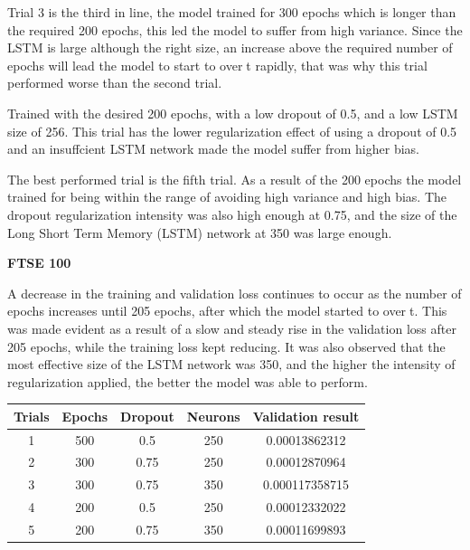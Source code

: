 \documentclass[a4paper,11pt,oneside]{book}
\begin{document}
Trial 3 is the third in line, the model trained for 300 epochs which is longer than the required 200 epochs,
this led the model to suffer from high variance. Since the LSTM is large although the right size, an increase
above the required number of epochs will lead the model to start to overt rapidly, that was why this trial
performed worse than the second trial.\newline

Trained with the desired 200 epochs, with a low dropout of 0.5, and a low LSTM size of 256. This trial
has the lower regularization effect of using a dropout of 0.5 and an insuffcient LSTM
network made the model suffer from higher bias.\newline

The best performed trial is the fifth trial. As a result of the 200 epochs the model trained for being within the range
of avoiding high variance and high bias. The dropout regularization intensity was also high enough at 0.75,
and the size of the Long Short Term Memory (LSTM) network at 350 was large enough.\newline\newline

\textbf{FTSE 100}\newline\newline

A decrease in the training and validation loss continues to occur as the number of epochs increases until 205
epochs, after which the model started to overt. This was made evident as a result of a slow and steady rise
in the validation loss after 205 epochs, while the training loss kept reducing.
It was also observed that the most effective size of the LSTM network was 350, and the higher the intensity
of regularization applied, the better the model was able to perform.
\begin{center}
	\begin{tabular}{||c c c c c||} 
		\hline
		Trials & Epochs & Dropout & Neurons & Validation result\\ [0.5ex] 
		\hline\hline
		1 & 500 & 0.5 & 250 & 0.00013862312 \\ 
		\hline
		2 & 300 & 0.75 & 250 & 0.00012870964 \\
		\hline
		3 & 300 & 0.75 & 350 & 0.000117358715 \\
		\hline
		4 & 200 & 0.5 & 250 & 0.00012332022 \\
		\hline
		5 & 200 & 0.75 & 350 & 0.00011699893\\ [1ex] 
		\hline
	\end{tabular}
\end{center}
\end{document}
